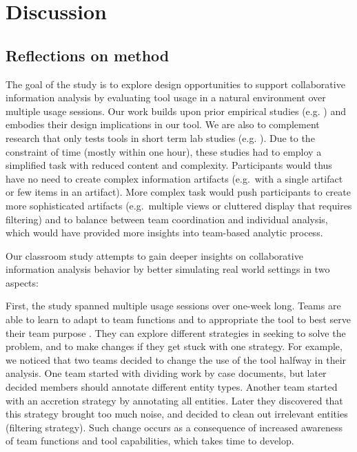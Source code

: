 
\section{Discussion}\label{discussion}

\subsection{Reflections on method}\label{reflections-on-method}

The goal of the study is to explore design opportunities to support
collaborative information analysis by evaluating tool usage in a natural
environment over multiple usage sessions. Our work builds upon prior
empirical studies (e.g.
\autocites{Carroll2013}{Borge2012}{Kang2011}{Chin2009}) and embodies
their design implications in our tool. We are also to complement
research that only tests tools in short term lab studies (e.g.
\autocites{Convertino2011}{Goyal2016}{Hajizadeh2013}). Due to the
constraint of time (mostly within one hour), these studies had to employ
a simplified task with reduced content and complexity. Participants
would thus have no need to create complex information artifacts
(e.g.~with a single artifact or few items in an artifact). More complex
task would push participants to create more sophisticated artifacts
(e.g.~multiple views or cluttered display that requires filtering) and
to balance between team coordination and individual analysis, which
would have provided more insights into team-based analytic process.

Our classroom study attempts to gain deeper insights on collaborative
information analysis behavior by better simulating real world settings
in two aspects:

First, the study spanned multiple usage sessions over one-week long.
Teams are able to learn to adapt to team functions and to appropriate
the tool to best serve their team purpose \autocite{Stahl2006}. They can
explore different strategies in seeking to solve the problem, and to
make changes if they get stuck with one strategy. For example, we
noticed that two teams decided to change the use of the tool halfway in
their analysis. One team started with dividing work by case documents,
but later decided members should annotate different entity types.
Another team started with an accretion strategy by annotating all
entities. Later they discovered that this strategy brought too much
noise, and decided to clean out irrelevant entities (filtering
strategy). Such change occurs as a consequence of increased awareness of
team functions and tool capabilities, which takes time to develop.

